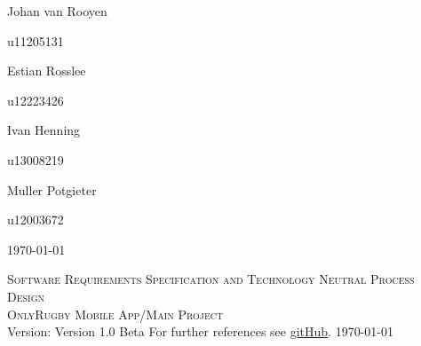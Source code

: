 \documentclass[a4paper,12pt]{report}
\begin{document}
\begin{titlepage}
\begin{center}
\begin{minipage}{0.4\textwidth}
\begin{flushleft} \large
Johan {van Rooyen}
\end{flushleft}
\end{minipage}
\begin{minipage}{0.4\textwidth}
\begin{flushright} \large
\emph{}
u11205131
\end{flushright}
\end{minipage}

\begin{minipage}{0.4\textwidth}
\begin{flushleft} \large
Estian {Rosslee}
\end{flushleft}
\end{minipage}
\begin{minipage}{0.4\textwidth}
\begin{flushright} \large
\emph{}
u12223426
\end{flushright}
\end{minipage}

\begin{minipage}{0.4\textwidth}
\begin{flushleft} \large
Ivan {Henning}
\end{flushleft}
\end{minipage}
\begin{minipage}{0.4\textwidth}
\begin{flushright} \large
\emph{}
u13008219
\end{flushright}
\end{minipage}

\begin{minipage}{0.4\textwidth}
\begin{flushleft} \large
Muller {Potgieter}
\end{flushleft}
\end{minipage}
\begin{minipage}{0.4\textwidth}
\begin{flushright} \large
\emph{}
u12003672
\end{flushright}
\end{minipage}

\vfill
{\large \today}
\end{center}
\end{titlepage}
\footnotesize
%
\normalsize

\renewcommand{\thesection}{\arabic{section}}
\newpage
\begin{center}
\textsc{\LARGE Software Requirements Specification and Technology Neutral Process Design}\\[1.5cm]
\textsc{\Large OnlyRugby Mobile App/Main Project}\\[0.5cm]
Version: Version 1.0 Beta
For further references see \href{ https://github.com/hermankeuris/OnlyRugbyApp.git}{gitHub}.
\today
\end{center}
\tableofcontents{}
\newpage
\end{document}
